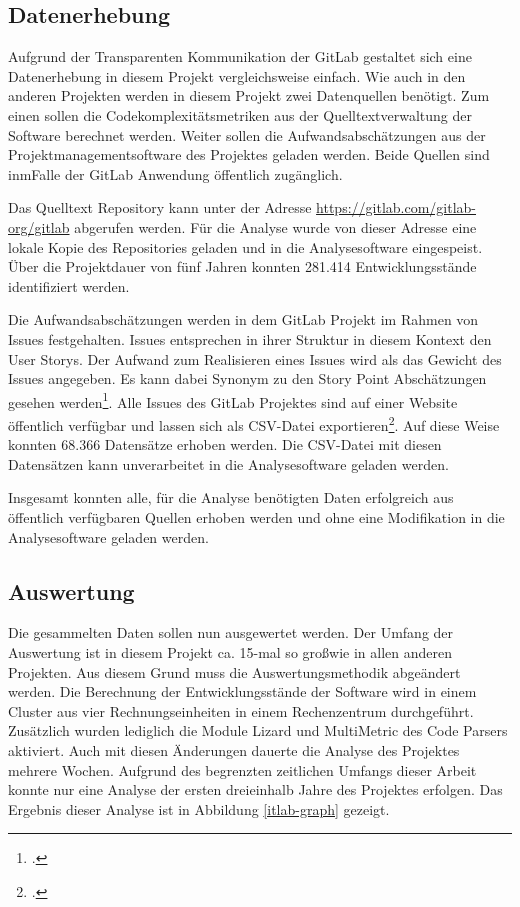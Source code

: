 \subsection{Datenerhebung}\label{gitlab-Datenerhebung}

Aufgrund der Transparenten Kommunikation der GitLab gestaltet sich eine
Datenerhebung in diesem Projekt vergleichsweise einfach. Wie auch in den
anderen Projekten werden in diesem Projekt zwei Datenquellen benötigt.
Zum einen sollen die Codekomplexitätsmetriken aus der
Quelltextverwaltung der Software berechnet werden. Weiter sollen die
Aufwandsabschätzungen aus der Projektmanagementsoftware des Projektes
geladen werden. Beide Quellen sind inmFalle der GitLab Anwendung
öffentlich zugänglich.

Das Quelltext Repository kann unter der Adresse
\url{https://gitlab.com/gitlab-org/gitlab} abgerufen werden. Für die
Analyse wurde von dieser Adresse eine lokale Kopie des Repositories
geladen und in die Analysesoftware eingespeist. Über die Projektdauer
von fünf Jahren konnten 281.414 Entwicklungsstände identifiziert werden.

Die Aufwandsabschätzungen werden in dem GitLab Projekt im Rahmen von
Issues festgehalten. Issues entsprechen in ihrer Struktur in diesem
Kontext den User Storys. Der Aufwand zum Realisieren eines Issues wird
als das Gewicht des Issues angegeben. Es kann dabei Synonym zu den Story
Point Abschätzungen gesehen werden\footcite[Vgl. ][]{ScaledAgileGitLab}. Alle
Issues des GitLab Projektes sind auf einer Website öffentlich verfügbar
und lassen sich als \ac{CSV}-Datei exportieren\footcite[Vgl. ][]{IssuesGitLabOrg}. Auf
diese Weise konnten 68.366 Datensätze erhoben werden. Die \ac{CSV}-Datei mit
diesen Datensätzen kann unverarbeitet in die Analysesoftware geladen
werden.

Insgesamt konnten alle, für die Analyse benötigten Daten erfolgreich aus
öffentlich verfügbaren Quellen erhoben werden und ohne eine Modifikation
in die Analysesoftware geladen werden.

\subsection{Auswertung}\label{gitlab-Auswertung}

Die gesammelten Daten sollen nun ausgewertet werden. Der Umfang der
Auswertung ist in diesem Projekt ca. 15-mal so gro\ss  wie in allen anderen
Projekten. Aus diesem Grund muss die Auswertungsmethodik abgeändert
werden. Die Berechnung der Entwicklungsstände der Software wird in einem
Cluster aus vier Rechnungseinheiten in einem Rechenzentrum durchgeführt.
Zusätzlich wurden lediglich die Module Lizard und MultiMetric des Code
Parsers aktiviert. Auch mit diesen Änderungen dauerte die Analyse des
Projektes mehrere Wochen. Aufgrund des begrenzten zeitlichen Umfangs
dieser Arbeit konnte nur eine Analyse der ersten dreieinhalb Jahre des
Projektes erfolgen. Das Ergebnis dieser Analyse ist in Abbildung \ref{itlab-graph}
gezeigt.

